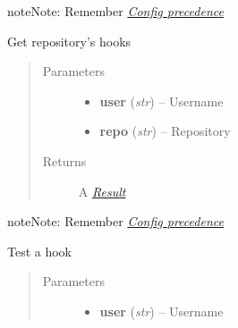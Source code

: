 \documentclass[letterpaper,10pt,english]{sphinxmanual}
\begin{document}
\begin{fulllineitems}
\begin{fulllineitems}
\begin{quote}
\begin{description}
\begin{itemize}
\end{itemize}

\end{description}\end{quote}

\begin{notice}{note}{Note:}
Remember {\hyperref[repos:config-precedence]{\emph{Config precedence}}}
\end{notice}

\end{fulllineitems}


\begin{fulllineitems}
\label{repos:pygithub3.services.repos.Hooks.list}
Get repository's hooks
\begin{quote}\begin{description}
\item[{Parameters}] \leavevmode\begin{itemize}
\item {} 
\textbf{user} (\emph{str}) -- Username

\item {} 
\textbf{repo} (\emph{str}) -- Repository

\end{itemize}

\item[{Returns}] \leavevmode
A {\hyperref[result::doc]{\emph{Result}}}

\end{description}\end{quote}

\begin{notice}{note}{Note:}
Remember {\hyperref[repos:config-precedence]{\emph{Config precedence}}}
\end{notice}

\end{fulllineitems}


\begin{fulllineitems}
\label{repos:pygithub3.services.repos.Hooks.test}
Test a hook
\begin{quote}\begin{description}
\item[{Parameters}] \leavevmode\begin{itemize}
\item {} 
\textbf{user} (\emph{str}) -- Username


\end{itemize}
\end{description}
\end{quote}
\end{fulllineitems}
\end{fulllineitems}
\end{document}
